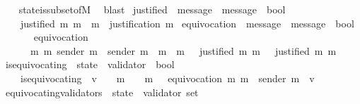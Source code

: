\begin{isabellebody}
%
\isadelimproof
\ \ %
\endisadelimproof
%
\isatagproof
{}\isamarkupfalse%
\ state{\isacharunderscore}is{\isacharunderscore}subset{\isacharunderscore}of{\isacharunderscore}M\ \isamarkupfalse%
\ blast%
\endisatagproof
{\isafoldproof}%
%
\isadelimproof
\isanewline
%
\endisadelimproof
\isanewline
\isanewline
{}\isamarkupfalse%
\ justified\ {\isacharcolon}{\isacharcolon}\ {\isachardoublequoteopen}message\ {\isasymRightarrow}\ message\ {\isasymRightarrow}\ bool{\isachardoublequoteclose}\isanewline
\ \ \isanewline
\ \ \ \ {\isachardoublequoteopen}justified\ m{}\ m{}\ {\isacharequal}\ {\isacharparenleft}m{}\ {\isasymin}\ justification\ m{}{\isacharparenright}{\isachardoublequoteclose}\isanewline
\isanewline
{}\isamarkupfalse%
\ equivocation\ {\isacharcolon}{\isacharcolon}\ {\isachardoublequoteopen}{\isacharparenleft}message\ {\isacharasterisk}\ message{\isacharparenright}\ {\isasymRightarrow}\ bool{\isachardoublequoteclose}\isanewline
\ \ \isanewline
\ \ \ \ {\isachardoublequoteopen}equivocation\ {\isacharequal}\isanewline
\ \ \ \ \ \ {\isacharparenleft}{\isasymlambda}{\isacharparenleft}m{}{\isacharcomma}\ m{}{\isacharparenright}{\isachardot}\ sender\ m{}\ {\isacharequal}\ sender\ m{}\ {\isasymand}\ m{}\ {\isasymnoteq}\ m{}\ {\isasymand}\ {\isasymnot}\ {\isacharparenleft}justified\ m{}\ m{}{\isacharparenright}\ {\isasymand}\ {\isasymnot}\ {\isacharparenleft}justified\ m{}\ m{}{\isacharparenright}{\isacharparenright}{\isachardoublequoteclose}\isanewline
\isanewline
\isanewline
{}\isamarkupfalse%
\ is{\isacharunderscore}equivocating\ {\isacharcolon}{\isacharcolon}\ {\isachardoublequoteopen}state\ {\isasymRightarrow}\ validator\ {\isasymRightarrow}\ bool{\isachardoublequoteclose}\isanewline
\ \ \isanewline
\ \ \ \ {\isachardoublequoteopen}is{\isacharunderscore}equivocating\ {\isasymsigma}\ v\ {\isacharequal}\ \ {\isacharparenleft}{\isasymexists}\ m{}\ {\isasymin}\ {\isasymsigma}{\isachardot}\ {\isasymexists}\ m{}\ {\isasymin}\ {\isasymsigma}{\isachardot}\ equivocation\ {\isacharparenleft}m{}{\isacharcomma}\ m{}{\isacharparenright}\ {\isasymand}\ sender\ m{}\ {\isacharequal}\ v{\isacharparenright}{\isachardoublequoteclose}\isanewline
\isanewline
{}\isamarkupfalse%
\ equivocating{\isacharunderscore}validators\ {\isacharcolon}{\isacharcolon}\ {\isachardoublequoteopen}state\ {\isasymRightarrow}\ validator\ set{\isachardoublequoteclose}\isanewline

\end{isabellebody}

